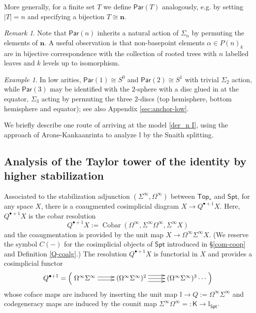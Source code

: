 \documentclass[12pt]{amsart}
\theoremstyle{definition}
\theoremstyle{remark}
\newtheorem{example}[subsection]{Example}
\newtheorem{remark}[subsection]{Remark}
\newcommand{\Top}{\mathsf{Top}_*}
\newcommand{\Spt}{\mathsf{Spt}}
\newcommand{\Sp}{\Sigma^{\infty}}
\newcommand{\U}{\Omega^{\infty}}
\newcommand{\Id}{\mathbb{I}}
\newcommand{\Cobar}{\operatorname{Cobar}}
\newcommand{\Par}{\mathsf{Par}}
\begin{document}
More generally, for a finite set $T$ we define $\Par(T)$ analogously, e.g. by setting $|T|=n$ and specifying a bijection $T\cong \mathbf{n}$. 

\begin{remark}
    Note that $\Par(n)$ inherits a natural action of $\Sigma_n$ by permuting the elements of $\mathbf{n}$. A useful observation is that non-basepoint elements $\alpha \in P(n)_k$ are in bijective correspondence with the collection of rooted trees with $n$ labelled leaves and $k$ levels up to isomorphism.
\end{remark}

\begin{example} \label{ex:par-low}
    In low arities, $\Par(1)\cong S^0$ and $\Par(2)\cong S^1$ with trivial $\Sigma_2$ action, while $\Par(3)$ may be identified with the $2$-sphere with a disc glued in at the equator, $\Sigma_3$ acting by permuting the three $2$-discs (top hemisphere, bottom hemisphere and equator); see also Appendix \ref{sec:anchor-low}.

\end{example}

We briefly describe one route of arriving at the model \eqref{der_n I}, using the approach of Arone-Kankaanrinta \cite{AK} to analyze $\Id$ by the Snaith splitting. 

\subsection{Analysis of the Taylor tower of the identity by higher stabilization}
Associated to the stabilization adjunction $(\Sp, \U)$ between $\Top$ and $\Spt$, for any space $X$, there is a coaugmented cosimplicial diagram $X\to Q^{\bullet+1}X$. Here, $Q^{\bullet+1}X$ is the cobar resolution \[Q^{\bullet+1}X:=\Cobar(\U, \Sp\U, \Sp X)\] and the coaugmentation is provided by the unit map $X\to \U \Sp X$. (We reserve the symbol $C(-)$ for the cosimplicial objects of $\Spt$ introduced in \S\ref{com-coop} and Definition \ref{Q-coalg}.) The resolution $Q^{\bullet+1}X$ is functorial in $X$ and provides a cosimplicial functor \begin{equation}
\label{eq:loop-susp-cosimplicial-res}
    Q^{\bullet+1} = \left( \xymatrix{
    \U \Sp  \ar@<.5 ex>[r] \ar@<-.5ex>[r] &
    (\U \Sp)^2 \ar@<1 ex>[r] \ar[r] \ar@<-1 ex>[r] &
    (\U \Sp)^3 \cdots
    }\right)
\end{equation} whose coface maps are induced by inserting the unit map $\Id \to Q:= \U \Sp$ and codegeneracy maps are induced by the counit map $\Sp\U=: \mathsf{K}\to \Id_{\Spt}$. 
\end{document}
